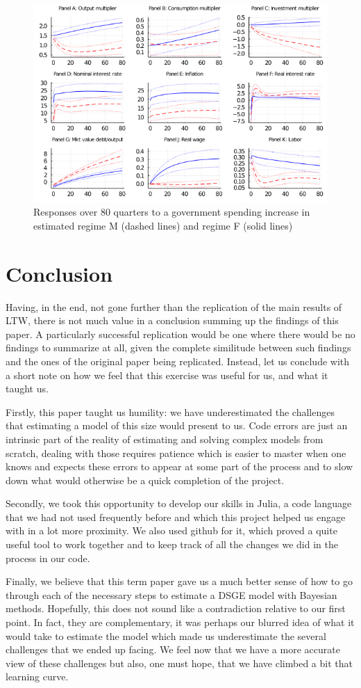\documentclass[letterpaper,12pt]{article}%
\begin{document}
\begin{figure}[H]
    \centering
    \includegraphics[width=12cm]{plotIRFs_N10000.png}
    \caption{Responses over 80 quarters to a government spending increase in estimated regime M (dashed lines) and
regime F (solid lines)}
    \label{fig:my_label}
\end{figure}



\section{Conclusion}
Having, in the end, not gone further than the replication of the main results of LTW, there is not much value in a conclusion summing up the findings of this paper. A particularly successful replication would be one where there would be no findings to summarize at all, given the complete similitude between such findings and the ones of the original paper being replicated. Instead, let us conclude with a short note on how we feel that this exercise was useful for us, and what it taught us. 

Firstly, this paper taught us humility: we have underestimated the challenges that estimating a model of this size would present to us. Code errors are just an intrinsic part of the reality of estimating and solving complex models from scratch, dealing with those requires patience which is easier to master when one knows and expects these errors to appear at some part of the process and to slow down what would otherwise be a quick completion of the project.

Secondly, we took this opportunity to develop our skills in Julia, a code language that we had not used frequently before and which this project helped us engage with in a lot more proximity. We also used github for it, which proved a quite useful tool to work together and to keep track of all the changes we did in the process in our code.

Finally, we believe that this term paper gave us a much better sense of how to go through each of the necessary steps to estimate a DSGE model with Bayesian methods. Hopefully, this does not sound like a contradiction relative to our first point. In fact, they are complementary, it was perhaps our blurred idea of what it would take to estimate the model which made us underestimate the several challenges that we ended up facing. We feel now that we have a more accurate view of these challenges but also, one must hope, that we have climbed a bit that learning curve.
\end{document}
